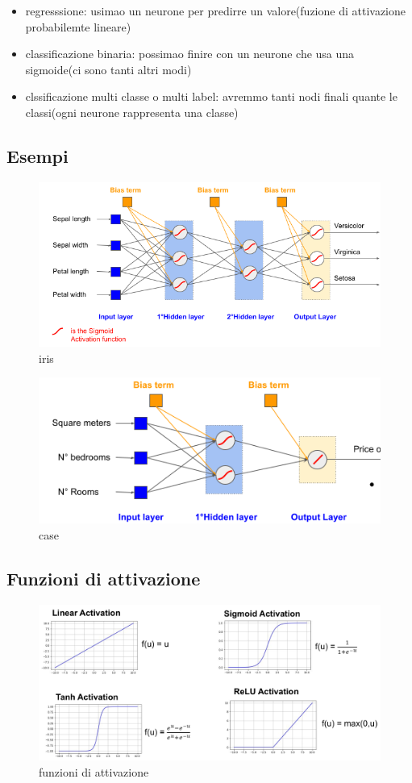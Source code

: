 \begin{itemize}
    \item regresssione: usimao un neurone per predirre un valore(fuzione di attivazione probabilemte lineare)
    \item classificazione binaria: possimao finire con un neurone che usa una sigmoide(ci sono tanti altri modi)
    \item clssificazione multi classe o multi label: avremmo tanti nodi finali quante le classi(ogni neurone rappresenta una classe)
\end{itemize}


\subsection{Esempi}
\begin{figure}[H]
    \centering
    \includegraphics[width=0.8\linewidth]{imgs/iris}
    \caption{iris}
    \label{fig:iris}
\end{figure}
\begin{figure}[H]
    \centering
    \includegraphics[width=0.8\linewidth]{imgs/case}
    \caption{case}
    \label{fig:case}
\end{figure}

\subsection{Funzioni di attivazione}

\begin{figure}[H]
    \centering
    \includegraphics[width=0.8\linewidth]{imgs/funzioni_attivazione}
    \caption{funzioni di attivazione}
    \label{fig:funzioni_attivazione}
\end{figure}

